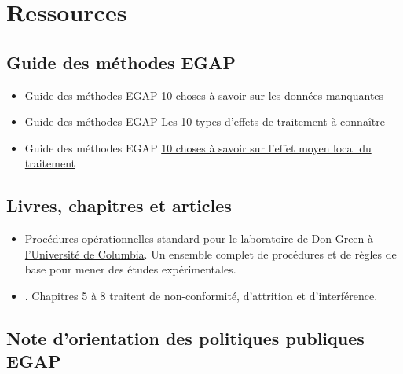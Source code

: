 \documentclass[
  12pt,
]{book}
\providecommand{\tightlist}{%
  \setlength{\itemsep}{0pt}\setlength{\parskip}{0pt}}
\begin{document}
\hypertarget{ressources-7}{%
\section{Ressources}\label{ressources-7}}

\hypertarget{guide-des-muxe9thodes-egap-7}{%
\subsection{Guide des méthodes EGAP}\label{guide-des-muxe9thodes-egap-7}}

\begin{itemize}
\item
  Guide des méthodes EGAP \href{https://egap.org/resource/10-things-to-know-about-missing-data/}{10 choses à savoir sur les données manquantes}
\item
  Guide des méthodes EGAP \href{https://egap.org/resource/10-types-of-treatment-effect-you-should-know-about/}{Les 10 types d'effets de traitement à connaître}
\item
  Guide des méthodes EGAP \href{https://egap.org/resource/10-things-to-know-about-the-local-average-treatment-effect/}{10 choses à savoir sur l'effet moyen local du traitement}
\end{itemize}

\hypertarget{livres-chapitres-et-articles-5}{%
\subsection{Livres, chapitres et articles}\label{livres-chapitres-et-articles-5}}

\begin{itemize}
\tightlist
\item
  \href{https://github.com/acoppock/Green-Lab-SOP}{Procédures opérationnelles standard pour le laboratoire de Don Green à l'Université de Columbia}. Un ensemble complet de procédures et de règles de base pour mener des études expérimentales.
\item
  \autocite{gerber_field_2012}. Chapitres 5 à 8 traitent de non-conformité, d'attrition et d'interférence.
\end{itemize}

\hypertarget{note-dorientation-des-politiques-publiques-egap}{%
\subsection{Note d'orientation des politiques publiques EGAP}\label{note-dorientation-des-politiques-publiques-egap}}
\end{document}
